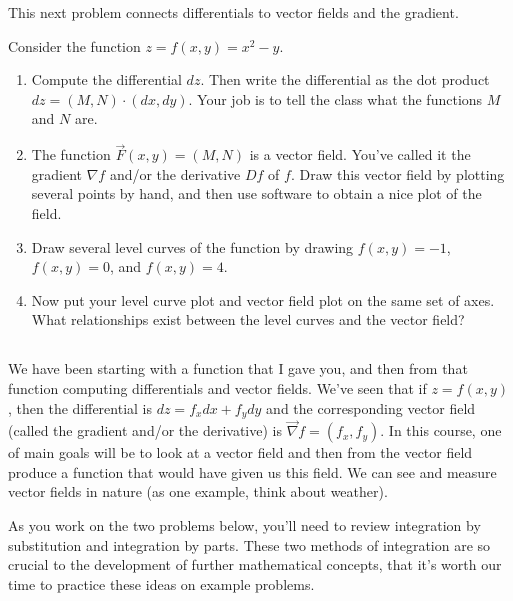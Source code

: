 This next problem connects differentials to vector fields and the gradient.




\begin{problem}
 Consider the function $z=f(x,y) = x^2-y$. 
\begin{enumerate}
 \item Compute the differential $dz$.  Then write the differential as the dot product $dz = (M,N)\cdot (dx,dy)$. Your job is to tell the class what the functions $M$ and $N$ are. 
 \item{}%
The function $\vec F(x,y) = (M,N)$ is a vector field. You've called it the gradient $\nabla f$ and/or the derivative $Df$ of $f$. Draw this vector field by plotting several points by hand, and then use software to obtain a nice plot of the field.
 \item {}%
Draw several level curves of the function by drawing $f(x,y)=-1$, $f(x,y)=0$, and $f(x,y)=4$.
 \item {}%
Now put your level curve plot and vector field plot on the same set of axes. What relationships exist between the level curves and the vector field? 
\end{enumerate}
\end{problem}

\subsection*{\ideaC}


We have been starting with a function that I gave you, and then from that function computing differentials and vector fields. We've seen that if $z=f(x,y)$, then the differential is $dz=f_xdx+f_ydy$ and the corresponding vector field (called the gradient and/or the derivative) is $\vec \nabla f = (f_x,f_y)$.  In this course, one of main goals will be to look at a vector field and then from the vector field produce a function that would have given us this field. We can see and measure vector fields in nature (as one example, think about weather).

As you work on the two problems below, you'll need to review integration by substitution and integration by parts.  These two methods of integration are so crucial to the development of further mathematical concepts, that it's worth our time to practice these ideas on example problems.  

